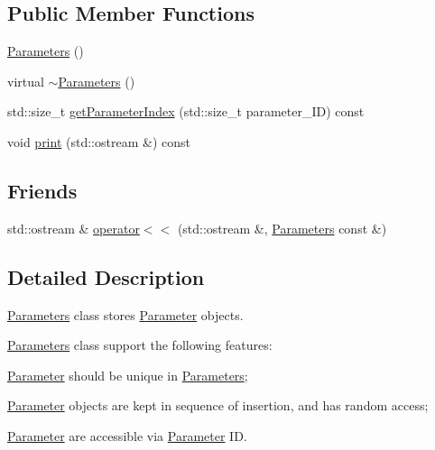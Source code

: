 \subsection*{Public Member Functions}
\begin{DoxyCompactItemize}
\item 
\mbox{\hyperlink{classanen_par_1_1_parameters_af4d94ee360ac0157d9065f78797fe9a1}{Parameters}} ()
\item 
virtual \mbox{\hyperlink{classanen_par_1_1_parameters_a640a1a349975a8cb023696f25e563a5c}{$\sim$\+Parameters}} ()
\item 
std\+::size\+\_\+t \mbox{\hyperlink{classanen_par_1_1_parameters_abf3060e2fbcf97b44a420d3f1ee72575}{get\+Parameter\+Index}} (std\+::size\+\_\+t parameter\+\_\+\+ID) const
\item 
void \mbox{\hyperlink{classanen_par_1_1_parameters_adff840358049658c4bb93c2b17480e74}{print}} (std\+::ostream \&) const
\end{DoxyCompactItemize}
\subsection*{Friends}
\begin{DoxyCompactItemize}
\item 
std\+::ostream \& \mbox{\hyperlink{classanen_par_1_1_parameters_a8ffabb0f94a5698a8a711fa5c449e622}{operator$<$$<$}} (std\+::ostream \&, \mbox{\hyperlink{classanen_par_1_1_parameters}{Parameters}} const \&)
\end{DoxyCompactItemize}


\subsection{Detailed Description}
\mbox{\hyperlink{classanen_par_1_1_parameters}{Parameters}} class stores \mbox{\hyperlink{classanen_par_1_1_parameter}{Parameter}} objects. 

\mbox{\hyperlink{classanen_par_1_1_parameters}{Parameters}} class support the following features\+:
\begin{DoxyEnumerate}
\item \mbox{\hyperlink{classanen_par_1_1_parameter}{Parameter}} should be unique in \mbox{\hyperlink{classanen_par_1_1_parameters}{Parameters}};
\item \mbox{\hyperlink{classanen_par_1_1_parameter}{Parameter}} objects are kept in sequence of insertion, and has random access;
\item \mbox{\hyperlink{classanen_par_1_1_parameter}{Parameter}} are accessible via \mbox{\hyperlink{classanen_par_1_1_parameter}{Parameter}} ID. 
\end{DoxyEnumerate}

